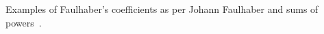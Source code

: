 Examples of Faulhaber's coefficients as per Johann Faulhaber and sums of powers~\cite{knuth1993johann}.

